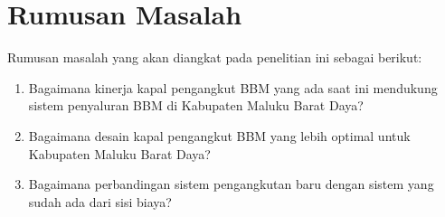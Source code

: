 \section{Rumusan Masalah}
\label{sec:rumusan masalah}

Rumusan masalah yang akan diangkat pada penelitian ini sebagai berikut:
\begin{enumerate}
    \item Bagaimana kinerja kapal pengangkut BBM yang ada saat ini mendukung sistem penyaluran BBM di Kabupaten Maluku Barat Daya?
    \item Bagaimana desain kapal pengangkut BBM yang lebih optimal untuk Kabupaten Maluku Barat Daya?
    \item Bagaimana perbandingan sistem pengangkutan baru dengan sistem yang sudah ada dari sisi biaya?
\end{enumerate}
